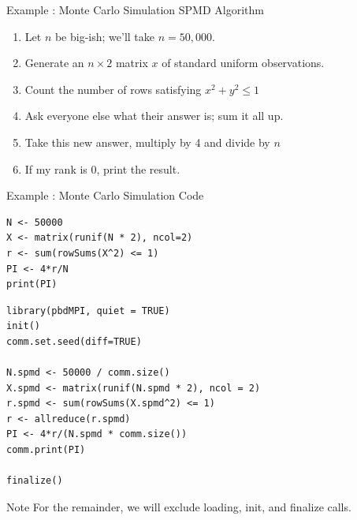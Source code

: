 \begin{frame}[fragile]
  \begin{block}{Example \showex :  Monte Carlo Simulation SPMD Algorithm}\pause
    \begin{enumerate}
     \item Let $n$ be big-ish; we'll take $n=50,000$.
     \item Generate an $n\times 2$ matrix $x$ of standard uniform observations.
     \item Count the number of rows satisfying $x^2 + y^2 \leq 1$
     \item Ask everyone else what their answer is; sum it all up.
     \item Take this new answer, multiply by 4 and divide by $n$
     \item If my rank is 0, print the result.
    \end{enumerate}
  \end{block}
\end{frame}


\begin{frame}
  \begin{exampleblock}{Example \showex :  Monte Carlo Simulation Code}\pause
\begin{lstlisting}[title=Serial Code]
N <- 50000
X <- matrix(runif(N * 2), ncol=2)
r <- sum(rowSums(X^2) <= 1)
PI <- 4*r/N
print(PI)
\end{lstlisting}

\begin{lstlisting}[title=Parallel Code]
library(pbdMPI, quiet = TRUE)
init()
comm.set.seed(diff=TRUE)

N.spmd <- 50000 / comm.size()
X.spmd <- matrix(runif(N.spmd * 2), ncol = 2)
r.spmd <- sum(rowSums(X.spmd^2) <= 1)
r <- allreduce(r.spmd)
PI <- 4*r/(N.spmd * comm.size())
comm.print(PI)

finalize()
\end{lstlisting}
  \end{exampleblock}
\end{frame}

\begin{frame}[fragile]
  \begin{block}{Note}\pause
    For the remainder, we will exclude loading, init, and finalize calls.
  \end{block}
\end{frame}










